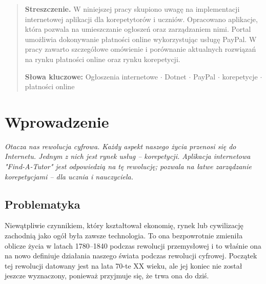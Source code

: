 \documentclass[12pt]{article}
\numberwithin{figure}{section}
\begin{document}
\begin{sloppypar}
\begin{abstract}
\textbf{Streszczenie.} 
W niniejszej pracy skupiono uwagę na implementacji internetowej aplikacji dla korepetytorów i uczniów.
Opracowano aplikacje, która pozwala na umieszczanie ogłoszeń oraz zarządzaniem nimi. Portal umożliwia dokonywanie płatności online wykorzystując usługę PayPal. W pracy zawarto szczegółowe omówienie i porównanie aktualnych rozwiązań na rynku płatności online oraz rynku korepetycji.
    
\textbf{Słowa kluczowe:}
Ogłoszenia internetowe $\cdot$ Dotnet $\cdot$ PayPal $\cdot$ korepetycje $\cdot$ płatności online

\end{abstract}
\pagebreak
\section{Wprowadzenie}
\textit{Otacza nas rewolucja cyfrowa. Każdy aspekt naszego życia przenosi się do Internetu. Jednym z nich jest rynek usług -- korepetycji. Aplikacja internetowa "Find-A-Tutor" jest odpowiedzią na tę rewolucję; pozwala na łatwe zarządzanie korepetycjami -- dla ucznia i nauczyciela.}
\subsection{Problematyka} \label{sec:problematyka}
Niewątpliwie czynnikiem, który kształtował ekonomię, rynek lub cywilizację zachodnią jako ogół była zawsze technologia. To ona bezpowrotnie zmieniła oblicze życia w latach 1780–1840 podczas rewolucji przemysłowej i to właśnie ona na nowo definiuje działania naszego świata podczas rewolucji cyfrowej. Początek tej rewolucji datowany jest na lata 70-te XX wieku, ale jej koniec nie został jeszcze wyznaczony, ponieważ przyjmuje się, że trwa ona do dziś.


\end{sloppypar}
\end{document}
